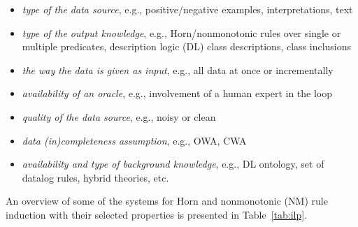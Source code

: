 



\begin{itemize}
\item \emph{type of the data source}, e.g., positive/negative examples, interpretations, text
\item \emph{type of the output knowledge}, e.g., Horn/nonmonotonic rules over single or multiple predicates, description logic (DL) class descriptions, class inclusions
\item \emph{the way the data is given as input}, e.g., all data at once or incrementally
\item \emph{availability of an oracle}, e.g., involvement of a human expert in the loop
\item \emph{quality of the data source}, e.g., noisy or clean
\item \emph{data (in)completeness assumption}, e.g., OWA, CWA
\item \emph{availability and type of background knowledge}, e.g., DL ontology, set of datalog rules, hybrid theories, etc.

\end{itemize}

An overview of some of the systems for Horn and nonmonotonic (NM) rule induction with their selected properties is presented in Table~\ref{tab:ilp}. 

